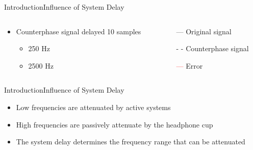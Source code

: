 \begin{frame}{Introduction}{Influence of System Delay}
	\begin{columns}
		\begin{column}{0.5\textwidth}
			\begin{itemize}
				\item Counterphase signal delayed 10 samples	
				\begin{itemize}
					\item 250 Hz
					\item 2500 Hz 
				\end{itemize}	
			\end{itemize}
			\vspace{-6.5mm}			
		\begin{center}
	 		
	 	\end{center}
		\end{column}
		\begin{column}{0.5\textwidth} 
		\begin{itemize}
			\item[\textcolor{MATLABblue}{---}] Original signal
			\item[\textcolor{MATLABblue}{- -}] Counterphase signal
			\item[\textcolor{red}{---}] Error
		\end{itemize}
		\begin{center}
	 		
	 	\end{center}
		\end{column}
	\end{columns}
\end{frame}

\begin{frame}{Introduction}{Influence of System Delay}
	\begin{center}
	\begin{itemize}
	\item Low frequencies are attenuated by active systems
	\item High frequencies are passively attenuate by the headphone cup 
	\item The system delay determines the frequency range that can be attenuated
	\end{itemize}
	\end{center}
\end{frame}


